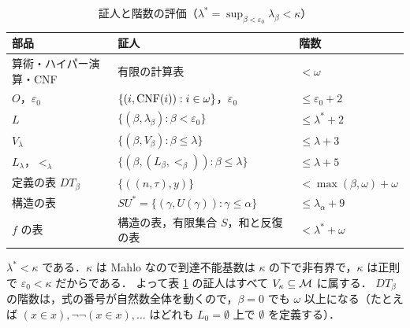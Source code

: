 \begin{table}[htbp]
\centering\small
\caption{証人と階数の評価（$\lambda^*=\sup_{\beta<\varepsilon_0}\lambda_\beta<\kappa$）}\label{tab:rank}
\begin{tabular}{lp{}l}
\toprule
部品 & 証人 & 階数\\
\midrule
算術・ハイパー演算・CNF & 有限の計算表 & $<\omega$\\
$O$，$\varepsilon_0$ & $\{(i,\mathrm{CNF}(i)):i\in\omega\}$，$\varepsilon_0$ & $\le\varepsilon_0+2$\\
$L$ & $\{(\beta,\lambda_\beta):\beta<\varepsilon_0\}$ & $\le\lambda^*+2$\\
$V_\lambda$ & $\{(\beta,V_\beta):\beta\le\lambda\}$ & $\le\lambda+3$\\
$L_\lambda$，$<_\lambda$ & $\{(\beta,(L_\beta,<_\beta)):\beta\le\lambda\}$ & $\le\lambda+5$\\
定義の表 $DT_\beta$ & $\{((n,\tau),y)\}$ & $<\max(\beta,\omega)+\omega$\\
構造の表 & $SU^*=\{(\gamma,U(\gamma)):\gamma\le\alpha\}$ & $\le\lambda_\alpha+9$\\
$f$ の表 & 構造の表，有限集合 $S$，和と反復の表 & $<\lambda^*+\omega$\\
\bottomrule
\end{tabular}
\end{table}

$\lambda^*<\kappa$ である．$\kappa$ は Mahlo なので到達不能基数は $\kappa$ の下で非有界で，$\kappa$ は正則で $\varepsilon_0<\kappa$ だからである．
よって表 \ref{tab:rank} の証人はすべて $V_\kappa\subseteq\mathcal{M}$ に属する．
$DT_\beta$ の階数は，式の番号が自然数全体を動くので，$\beta=0$ でも $\omega$ 以上になる（たとえば $(x\in x),\neg\neg(x\in x),\dots$ はどれも $L_0=\emptyset$ 上で $\emptyset$ を定義する）．


